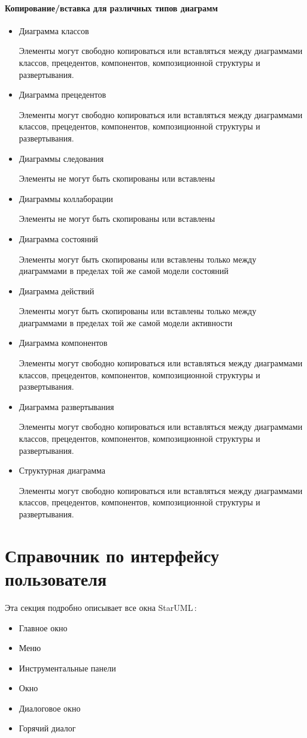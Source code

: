 \documentclass[a4paper,12pt]{report}
\newcommand{\staruml}{StarUML\,\tm}
\begin{document}
\subsubsection*{Копирование/вставка для различных типов диаграмм}
\begin{itemize}
	\item Диаграмма классов
	
	Элементы могут свободно копироваться или вставляться между диаграммами классов,
	прецедентов, компонентов, композиционной структуры и развертывания.
	\item Диаграмма прецедентов
	
	Элементы могут свободно копироваться или вставляться между диаграммами классов,
	прецедентов, компонентов, композиционной структуры и развертывания.
	\item Диаграммы следования
	
	Элементы не могут быть скопированы или вставлены
	\item Диаграммы коллаборации
	
	Элементы не могут быть скопированы или вставлены
	\item Диаграмма состояний
	
	Элементы могут быть скопированы или вставлены только между диаграммами в пределах
	той же самой модели состояний
	\item Диаграмма действий
	
	Элементы могут быть скопированы или вставлены только между диаграммами в пределах
	той же самой модели активности
	\item Диаграмма компонентов
	
	Элементы могут свободно копироваться или вставляться между диаграммами классов,
	прецедентов, компонентов, композиционной структуры и развертывания.
	\item Диаграмма развертывания
	
	Элементы могут свободно копироваться или вставляться между диаграммами классов,
	прецедентов, компонентов, композиционной структуры и развертывания.
	\item Структурная диаграмма
	
	Элементы могут свободно копироваться или вставляться между диаграммами классов,
	прецедентов, компонентов, композиционной структуры и развертывания.
\end{itemize}


\chapter{Справочник по интерфейсу пользователя}
Эта секция подробно описывает все окна \staruml:
\begin{itemize}
	\item Главное окно
	\item Меню
	\item Инструментальные панели
	\item Окно
	\item Диалоговое окно
	\item Горячий диалог
\end{itemize}
\end{document}
